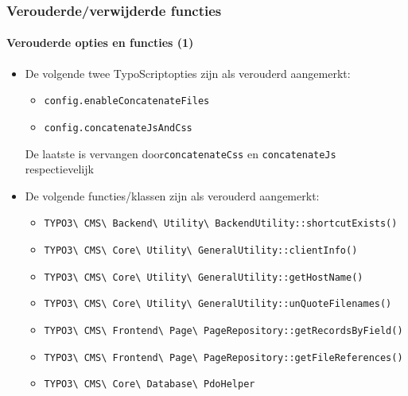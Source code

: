 \begin{frame}[fragile]
	\frametitle{Verouderde/verwijderde functies}
	\framesubtitle{Verouderde opties en functies (1)}

	\begin{itemize}
		\item De volgende twee TypoScriptopties zijn als verouderd aangemerkt:

			\begin{itemize}\smaller
                \item \texttt{config.enableConcatenateFiles}
                \item \texttt{config.concatenateJsAndCss}
            \end{itemize}

        	\smaller
				De laatste is vervangen door\texttt{concatenateCss} en
					\texttt{concatenateJs} respectievelijk
			\normalsize

		\item De volgende functies/klassen zijn als verouderd aangemerkt:

			\begin{itemize}\smaller
				\item \texttt{TYPO3\textbackslash
					CMS\textbackslash
					Backend\textbackslash
					Utility\textbackslash
					BackendUtility::shortcutExists()}

				\item \texttt{TYPO3\textbackslash
					CMS\textbackslash
					Core\textbackslash
					Utility\textbackslash
					GeneralUtility::clientInfo()}

				\item \texttt{TYPO3\textbackslash
					CMS\textbackslash
					Core\textbackslash
					Utility\textbackslash
					GeneralUtility::getHostName()}

				\item \texttt{TYPO3\textbackslash
					CMS\textbackslash
					Core\textbackslash
					Utility\textbackslash
					GeneralUtility::unQuoteFilenames()}

				\item \texttt{TYPO3\textbackslash
					CMS\textbackslash
					Frontend\textbackslash
					Page\textbackslash
					PageRepository::getRecordsByField()}

				\item \texttt{TYPO3\textbackslash
					CMS\textbackslash
					Frontend\textbackslash
					Page\textbackslash
					PageRepository::getFileReferences()}

				\item \texttt{TYPO3\textbackslash
					CMS\textbackslash
					Core\textbackslash
					Database\textbackslash
					PdoHelper}

			\end{itemize}
	\end{itemize}

\end{frame}

